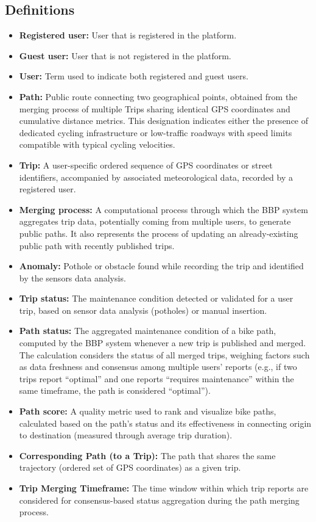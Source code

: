 \subsection{Definitions}
\begin{itemize}
    \item \textbf{Registered user:} User that is registered in the platform.
    \item \textbf{Guest user:} User that is not registered in the platform.
    \item \textbf{User:} Term used to indicate both registered and guest users.
    \item \textbf{Path:} Public route connecting two geographical points, obtained from the merging process of multiple Trips sharing identical GPS coordinates and cumulative distance metrics. This designation indicates either the presence of dedicated cycling infrastructure or low-traffic roadways with speed limits compatible with typical cycling velocities.
    \item \textbf{Trip:} A user-specific ordered sequence of GPS coordinates or street identifiers, accompanied by associated meteorological data, recorded by a registered user.
    \item \textbf{Merging process:} A computational process through which the BBP system aggregates trip data, potentially coming from multiple users, to generate public paths. It also represents the process of updating an already-existing public path with recently published trips.
    \item \textbf{Anomaly:} Pothole or obstacle found while recording the trip and identified by the sensors data analysis.
    \item \textbf{Trip status:} The maintenance condition detected or validated for a user trip, based on sensor data analysis (potholes) or manual insertion.
    \item \textbf{Path status:} The aggregated maintenance condition of a bike path, computed by the BBP system whenever a new trip is published and merged. The calculation considers the status of all merged trips, weighing factors such as data freshness and consensus among multiple users' reports (e.g., if two trips report ``optimal'' and one reports ``requires maintenance'' within the same timeframe, the path is considered ``optimal'').
    \item \textbf{Path score:} A quality metric used to rank and visualize bike paths, calculated based on the path's status and its effectiveness in connecting origin to destination (measured through average trip duration).
    \item \textbf{Corresponding Path (to a Trip):} The path that shares the same trajectory (ordered set of GPS coordinates) as a given trip.
    \item \textbf{Trip Merging Timeframe:} The time window within which trip reports are considered for consensus-based status aggregation during the path merging process.
\end{itemize}

